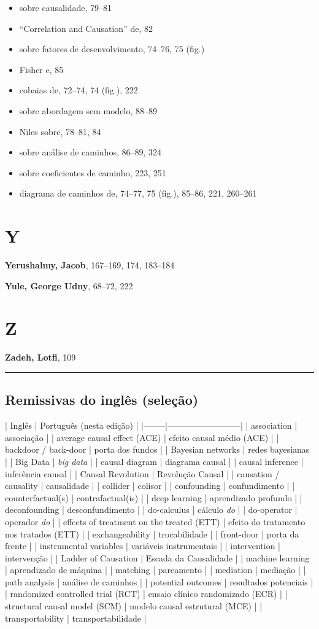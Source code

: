 \documentclass[11pt,a5paper,twoside]{book}
\begin{document}
\begin{itemize}
\item sobre causalidade, 79–81
\item “Correlation and Causation” de, 82
\item sobre fatores de desenvolvimento, 74–76, 75 (fig.)
\item Fisher e, 85
\item cobaias de, 72–74, 74 (fig.), 222
\item sobre abordagem sem modelo, 88–89
\item Niles sobre, 78–81, 84
\item sobre análise de caminhos, 86–89, 324
\item sobre coeficientes de caminho, 223, 251
\item diagrama de caminhos de, 74–77, 75 (fig.), 85–86, 221, 260–261
\end{itemize}
\section{Y}
\textbf{Yerushalmy, Jacob}, 167–169, 174, 183–184

\textbf{Yule, George Udny}, 68–72, 222

\section{Z}
\textbf{Zadeh, Lotfi}, 109

\vspace{1em}\hrule\vspace{1em}
\subsection{Remissivas do inglês (seleção)}
| Inglês | Português (nesta edição) | |--------|--------------------------| | association | associação | | average causal effect (ACE) | efeito causal médio (ACE) | | backdoor / back-door | porta dos fundos | | Bayesian networks | redes bayesianas | | Big Data | \textit{big data} | | causal diagram | diagrama causal | | causal inference | inferência causal | | Causal Revolution | Revolução Causal | | causation / causality | causalidade | | collider | colisor | | confounding | confundimento | | counterfactual(s) | contrafactual(is) | | deep learning | aprendizado profundo | | deconfounding | desconfundimento | | do-calculus | cálculo \textit{do} | | do-operator | operador \textit{do} | | effects of treatment on the treated (ETT) | efeito do tratamento nos tratados (ETT) | | exchangeability | trocabilidade | | front-door | porta da frente | | instrumental variables | variáveis instrumentais | | intervention | intervenção | | Ladder of Causation | Escada da Causalidade | | machine learning | aprendizado de máquina | | matching | pareamento | | mediation | mediação | | path analysis | análise de caminhos | | potential outcomes | resultados potenciais | | randomized controlled trial (RCT) | ensaio clínico randomizado (ECR) | | structural causal model (SCM) | modelo causal estrutural (MCE) | | transportability | transportabilidade |
\end{document}
